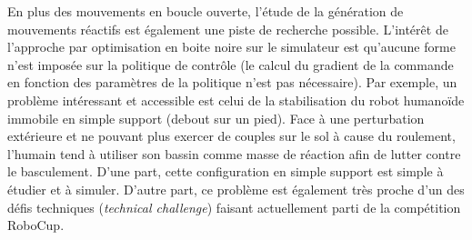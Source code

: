 En plus des mouvements en boucle ouverte,
l'étude de la génération de mouvements réactifs est également
une piste de recherche possible.
L'intérêt de l'approche par optimisation en boite noire sur le simulateur
est qu'aucune forme n'est imposée sur la politique de contrôle 
(le calcul du gradient de la commande en fonction des paramètres 
de la politique n'est pas nécessaire).
Par exemple, un problème intéressant et accessible est celui de la stabilisation 
du robot humanoïde immobile en simple support (debout sur un pied).
Face à une perturbation extérieure et ne pouvant plus exercer de couples 
sur le sol à cause du roulement, l'humain tend à utiliser 
son bassin comme masse de réaction afin de lutter contre le basculement.
D'une part, cette configuration en simple support est simple à étudier et à simuler.
D'autre part, ce problème est également très proche d'un des défis techniques 
(\textit{technical challenge}) faisant actuellement parti de la compétition RoboCup.\\

